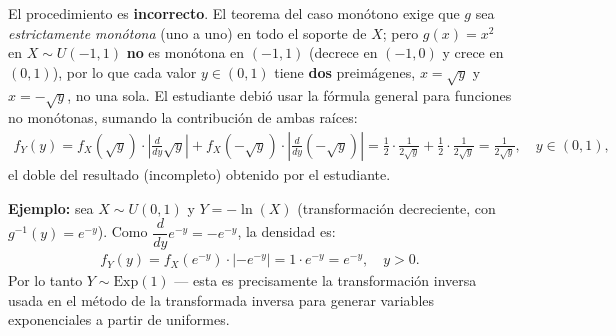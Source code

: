 \begin{solproblema}[prob:5ce800e]
	El procedimiento es \textbf{incorrecto}. El teorema del caso monótono exige que $g$ sea \emph{estrictamente monótona} (uno a uno) en todo el soporte de $X$; pero $g(x)=x^2$ en $X\sim U(-1,1)$ \textbf{no} es monótona en $(-1,1)$ (decrece en $(-1,0)$ y crece en $(0,1)$), por lo que cada valor $y\in(0,1)$ tiene \textbf{dos} preimágenes, $x=\sqrt{y}$ y $x=-\sqrt{y}$, no una sola. El estudiante debió usar la fórmula general para funciones no monótonas, sumando la contribución de ambas raíces:
	\begin{align*}
		f_Y(y) = f_X(\sqrt{y})\cdot\left|\frac{d}{dy}\sqrt{y}\right| + f_X(-\sqrt{y})\cdot\left|\frac{d}{dy}(-\sqrt{y})\right| = \frac{1}{2}\cdot\frac{1}{2\sqrt{y}} + \frac{1}{2}\cdot\frac{1}{2\sqrt{y}} = \frac{1}{2\sqrt{y}}, \quad y\in(0,1),
	\end{align*}
	el doble del resultado (incompleto) obtenido por el estudiante.
\end{solproblema}

\begin{solproblema}[prob:12a4921]
	\textbf{Ejemplo:} sea $X \sim U(0,1)$ y $Y = -\ln(X)$ (transformación decreciente, con $g^{-1}(y)=e^{-y}$). Como $\dfrac{d}{dy}e^{-y} = -e^{-y}$, la densidad es:
	\begin{align*}
		f_Y(y) = f_X(e^{-y})\cdot|-e^{-y}| = 1\cdot e^{-y} = e^{-y}, \quad y>0.
	\end{align*}
	Por lo tanto $Y \sim \text{Exp}(1)$ — esta es precisamente la transformación inversa usada en el método de la transformada inversa para generar variables exponenciales a partir de uniformes.
\end{solproblema}
